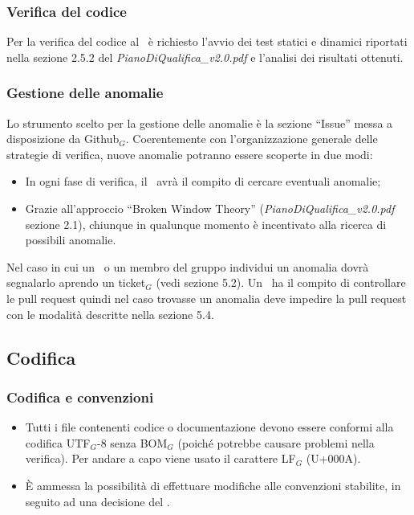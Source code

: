 \subsubsection{Verifica del codice}
Per la verifica del codice al \ruoloVerificatore\ è richiesto l'avvio dei test statici e dinamici riportati nella sezione 2.5.2 del \textit{PianoDiQualifica\_v2.0.pdf} e l'analisi dei risultati ottenuti.

\subsubsection{Gestione delle anomalie}

Lo strumento scelto per la gestione delle anomalie è la sezione ``Issue'' messa a disposizione da Github$_G$. Coerentemente con l'organizzazione generale delle strategie di verifica, nuove anomalie potranno essere scoperte in due modi:

\begin{itemize}
	\item In ogni fase di verifica, il \ruoloVerificatore\ avrà il compito di cercare eventuali anomalie;
	\item Grazie all'approccio ``Broken Window Theory'' (\textit{PianoDiQualifica\_v2.0.pdf} sezione 2.1), chiunque in qualunque momento è incentivato alla ricerca di possibili anomalie.
\end{itemize}
Nel caso in cui un \ruoloVerificatore\ o un membro del gruppo individui un anomalia dovrà segnalarlo aprendo un ticket$_G$ (vedi sezione 5.2). Un \ruoloVerificatore\ ha il compito di controllare le pull request quindi nel caso trovasse un anomalia deve impedire la pull request con le modalità descritte nella sezione 5.4.

\subsection{Codifica}
\subsubsection{Codifica e convenzioni}
\begin{itemize}
	\item Tutti i file contenenti codice o documentazione devono essere conformi alla codifica UTF$_G$-8 senza BOM$_G$ (poiché potrebbe causare problemi nella verifica). Per andare a capo viene usato il carattere LF$_G$ (U+000A).
	\item È ammessa la possibilità di effettuare modifiche alle convenzioni stabilite, in seguito ad una decisione del \ruoloResponsabile .
\end{itemize}

